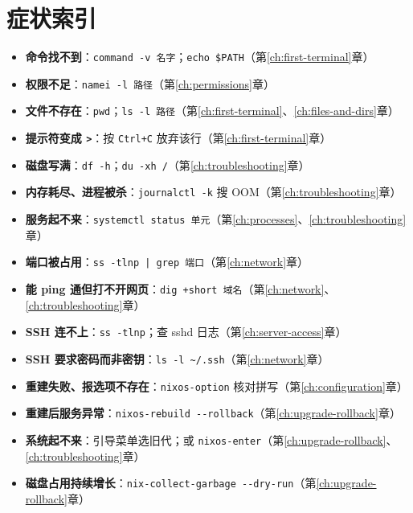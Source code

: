 \chapter{症状索引}


\ifbknarrow
\begin{itemize}
  \item \textbf{命令找不到}：\texttt{command -v 名字}；\texttt{echo \$PATH}（第\ref{ch:first-terminal}章）
  \item \textbf{权限不足}：\texttt{namei -l 路径}（第\ref{ch:permissions}章）
  \item \textbf{文件不存在}：\texttt{pwd}；\texttt{ls -l 路径}（第\ref{ch:first-terminal}、\ref{ch:files-and-dirs}章）
  \item \textbf{提示符变成 \texttt{>}}：按 \texttt{Ctrl+C} 放弃该行（第\ref{ch:first-terminal}章）
  \item \textbf{磁盘写满}：\texttt{df -h}；\texttt{du -xh /}（第\ref{ch:troubleshooting}章）
  \item \textbf{内存耗尽、进程被杀}：\texttt{journalctl -k} 搜 OOM（第\ref{ch:troubleshooting}章）
  \item \textbf{服务起不来}：\texttt{systemctl status 单元}（第\ref{ch:processes}、\ref{ch:troubleshooting}章）
  \item \textbf{端口被占用}：\texttt{ss -tlnp | grep 端口}（第\ref{ch:network}章）
  \item \textbf{能 ping 通但打不开网页}：\texttt{dig +short 域名}（第\ref{ch:network}、\ref{ch:troubleshooting}章）
  \item \textbf{SSH 连不上}：\texttt{ss -tlnp}；查 sshd 日志（第\ref{ch:server-access}章）
  \item \textbf{SSH 要求密码而非密钥}：\texttt{ls -l \textasciitilde/.ssh}（第\ref{ch:network}章）
  \item \textbf{重建失败、报选项不存在}：\texttt{nixos-option} 核对拼写（第\ref{ch:configuration}章）
  \item \textbf{重建后服务异常}：\texttt{nixos-rebuild -{}-rollback}（第\ref{ch:upgrade-rollback}章）
  \item \textbf{系统起不来}：引导菜单选旧代；或 \texttt{nixos-enter}（第\ref{ch:upgrade-rollback}、\ref{ch:troubleshooting}章）
  \item \textbf{磁盘占用持续增长}：\texttt{nix-collect-garbage -{}-dry-run}（第\ref{ch:upgrade-rollback}章）

\end{itemize}
